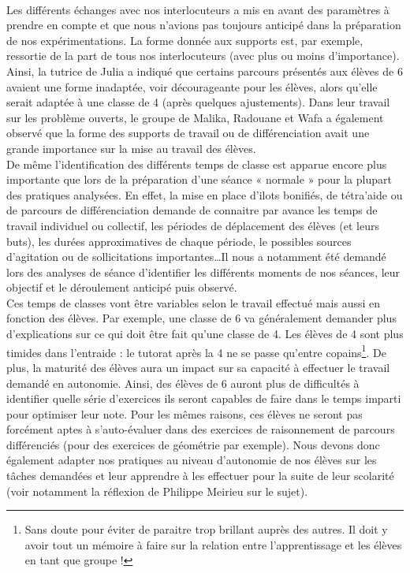 \paragraph*{}
Les différents échanges avec nos interlocuteurs a mis en avant des paramètres à prendre en compte et que nous n'avions pas toujours anticipé dans la préparation de nos expérimentations. La forme donnée aux supports est, par exemple, ressortie de la part de tous nos interlocuteurs (avec plus ou moins d'importance). Ainsi, la tutrice de Julia a indiqué que certains parcours présentés aux élèves de 6 avaient une forme inadaptée, voir décourageante pour les élèves, alors qu'elle serait adaptée à une classe de 4 (après quelques ajustements). Dans leur travail sur les problème ouverts, le groupe de Malika, Radouane et Wafa a également observé que la forme des supports de travail ou de différenciation avait une grande importance sur la mise au travail des élèves.\\
De même l'identification des différents temps de classe est apparue encore plus importante que lors de la préparation d'une séance « normale » pour la plupart des pratiques analysées. En effet, la mise en place d'ilots bonifiés, de tétra'aide ou de parcours de différenciation demande de connaitre par avance les temps de travail individuel ou collectif, les périodes de déplacement des élèves (et leurs buts), les durées approximatives de chaque période, le possibles sources d'agitation ou de sollicitations importantes\ldots Il nous a notamment été demandé lors des analyses de séance d'identifier les différents moments de nos séances, leur objectif et le déroulement anticipé puis observé.\\
Ces temps de classes vont être variables selon le travail effectué mais aussi en fonction des élèves. Par exemple, une classe de 6 va généralement demander plus d'explications sur ce qui doit être fait qu'une classe de 4. Les élèves de 4 sont plus timides dans l'entraide : le tutorat après la 4 ne se passe qu'entre copains\footnote{Sans doute pour éviter de paraitre trop brillant auprès des autres. Il doit y avoir tout un mémoire à faire sur
la relation entre l'apprentissage et les élèves en tant que groupe !}.
De plus, la maturité des élèves aura un impact sur sa capacité à effectuer le travail demandé en autonomie. Ainsi, des élèves de 6 auront plus de difficultés à identifier quelle série d'exercices ils seront capables de faire dans le temps imparti pour optimiser leur note. Pour les mêmes raisons, ces élèves ne seront pas forcément aptes à s'auto-évaluer dans des exercices de raisonnement de parcours différenciés (pour des exercices de géométrie par exemple). Nous devons donc également adapter nos pratiques au niveau d'autonomie de nos élèves sur les tâches demandées et leur apprendre à les effectuer pour la suite de leur scolarité (voir notamment la réflexion de Philippe Meirieu\cite{Meirieu_autonomie} sur le sujet).\\
